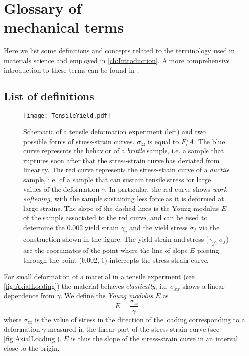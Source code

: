 \appendix

\chapter[Glossary of mechanical terms]{Glossary of \\ mechanical terms\label{app:Glossary}}

Here we list some definitions and concepts related to the terminology used in materials science and employed in \autoref{ch:Introduction}. A more comprehensive introduction to these terms can be found in \cite{ashby2005materials}.

\section*{List of definitions}

\begin{figure}[h!] 
\centering 
\texttt{[image: TensileYield.pdf]} 
\caption{Schematic of a tensile deformation experiment (left) and two possible forms of stress-strain curves. $\sigma_{zz}$ is equal to $F/A$. The blue curve represents the behavior of a \emph{brittle} sample, i.e. a sample that ruptures soon after that the stress-strain curve has deviated from linearity. The red curve represents the stress-strain curve of a \emph{ductile} sample, i.e. of a sample that can sustain tensile stress for large values of the deformation $\gamma$. In particular, the red curve shows \emph{work-softening}, with the sample sustaining less force as it is deformed at large strains. The slope of the dashed lines is the Young modulus $E$ of the sample associated to the red curve, and can be used to determine the 0.002 yield strain $\gamma_{y}$ and the yield stress $\sigma_{f}$ via the construction shown in the figure. The yield strain and stress ($\gamma_{y}$, $\sigma_{f}$) are the coordinates of the point where the line of slope $E$ passing through the point (0.002, 0) intercepts the stress-strain curve. \label{fig:AxialLoading}}
\end{figure}

\clearpage

For small deformation of a material in a tensile experiment (see \autoref{fig:AxialLoading}) the material behaves \emph{elastically}, i.e. $\sigma_{xx}$ shows a linear dependence from $\gamma$. We define the \emph{Young modulus} $E$ as
\begin{equation}
	E = \frac{\sigma_{zz}}{\gamma}
\end{equation}
where $\sigma_{zz}$ is the value of stress in the direction of the loading corresponding to a deformation $\gamma$ measured in the linear part of the stress-strain curve (see \autoref{fig:AxialLoading}).
$E$ is thus the slope of the stress-strain curve in an interval close to the origin.


